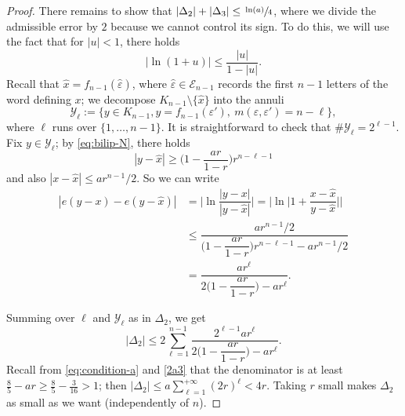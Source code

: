 \documentclass[10pt]{amsart}
\let\backslash\setminus
\let\wh\widehat
\numberwithin{equation}{section}
\theoremstyle{plain}
\theoremstyle{definition}
\newcommand{\cY}{{\mathcal Y}}
\newcommand{\cE}{{\mathcal E}}
\begin{document}
\begin{proof}
There remains to show that $|\Delta_2|+ |\Delta_3|\le \sfrac{\ln(a)}{4}$,
where we divide the admissible error by $2$ because we cannot control its sign.
To do this, we will use the fact that for $|u|<1$, there holds
\begin{equation}\label{eq:prop-log}
|\ln (1+u)| \le \dfrac{ |u|}{1-|u|}.
\end{equation}
Recall that $\wh x = f_{n-1}(\wh\varepsilon)$, where $\wh\varepsilon \in \cE_{n-1}$
records the first $n-1$ letters of the word defining $x$; we decompose $K_{n-1}\backslash \{\wh x\}$ into the annuli
\[
\cY_\ell := \big \{ y \in K_{n-1}, y= f_{n-1}(\varepsilon'),\ m(\varepsilon,\varepsilon') = n-\ell \big \},
\]
where $\ell$ runs over $\{1,\dots, n-1\}$. It is straightforward to check that $\# \cY_\ell = 2^{\ell-1}$. Fix $y\in \cY_\ell$; %
by \eqref{eq:bilip-N}, there holds
\begin{equation}\label{eq:dist-ywhx}
|y-\wh x| \ge \Big (1- \dfrac{ar}{1-r}\Big )r^{n-\ell-1}
\end{equation}
and also $|x-\wh x|\le a r^{n-1}/2$. So
we can write\vspace*{-3pt}
\begin{align*}
|e(y-x)-e(y-\wh x)| &= \Big|\ln \dfrac{|y-x|}{|y-\wh x|} \Big |
= \Big|\ln \Big | 1 + \dfrac{x-\wh x}{y-\wh x} \Big| \Big|\\
&\le \dfrac{a r^{n-1}/2}{\Big (1- \dfrac{ar}{1-r}\Big )r^{n-\ell-1}- a r^{n-1}/2}\\
&= \dfrac{a r^\ell}{2 \Big (1- \dfrac{ar}{1-r}\Big )- a r^\ell}.
\end{align*}

Summing over $\ell$ and $\cY_\ell$ as in $\Delta_2$, we get\vspace*{-3pt}
\begin{equation}\label{eq:delta2-bound}
|\Delta_2| \le 2 \sum_{\ell=1}^{n-1} \dfrac{2^{\ell-1} a r^\ell}{2\Big (1- \dfrac{ar}{1-r}\Big )- a r^\ell}.
\end{equation}
Recall from \eqref{eq:condition-a} and \eqref{2a3} that the denominator is at least
\hbox{$\frac85 - a r \!\geq\! \frac85 - \frac{3}{16} \!>\! 1$}; then $|\Delta_2| \le a \sum_{\ell=1}^{+\infty} (2r)^\ell
< 4r$. Taking $r$ small makes $\Delta_2$ as small as we want (independently of $n$).


\end{proof}
\end{document}
